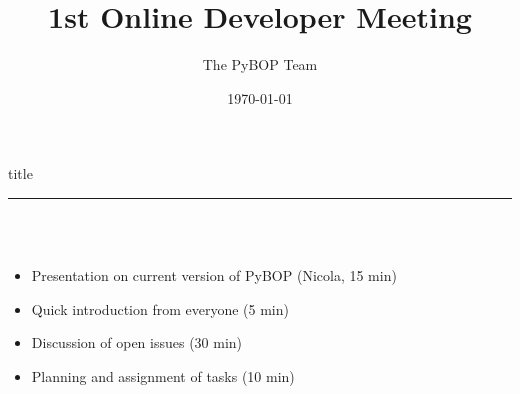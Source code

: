 \documentclass[aspectratio=169]{beamer} %
\title{1st Online Developer Meeting}
\author{The PyBOP Team \texorpdfstring{\href{https://github.com/pybop-team/PyBOP}{\faGithub}}{}}
\institute{}
\date{\today}
\begin{document}
{ 
%
\frame{\titlepage}}


\begin{frame}[plain]
    \centering
    \begin{beamercolorbox}[sep=8pt,center,shadow=true,rounded=true]{title}
    \par%
    \color{oxfordblue}\noindent\rule{10cm}{1pt} \\
    \LARGE{\faFileTextO} \\
    \vspace{6mm} \normalsize
    \begin{itemize}
        \item Presentation on current version of PyBOP (Nicola, 15 min)
        \item Quick introduction from everyone (5 min)
        \item Discussion of open issues (30 min)
        \item Planning and assignment of tasks (10 min)
    \end{itemize}
    \end{beamercolorbox}
\end{frame}
  
\end{document}
